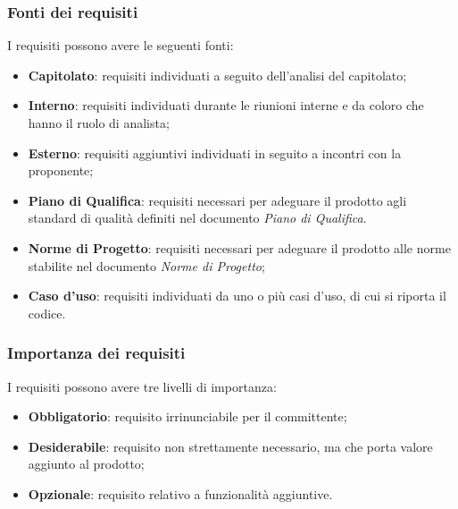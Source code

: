 \subsubsection{Fonti dei requisiti}
\label{sec:fonti_requisiti}
I requisiti possono avere le seguenti fonti:
\begin{itemize}
	\item \textbf{Capitolato}: requisiti individuati a seguito dell'analisi del capitolato;
	\item \textbf{Interno}: requisiti individuati durante le riunioni interne e da coloro che hanno il ruolo di analista;
	\item \textbf{Esterno}: requisiti aggiuntivi individuati in seguito a incontri con la proponente;
	\item \textbf{Piano di Qualifica}: requisiti necessari per adeguare il prodotto agli standard di qualità definiti nel documento \textit{Piano di Qualifica}.
	\item \textbf{Norme di Progetto}: requisiti necessari per adeguare il prodotto alle norme stabilite nel documento \textit{Norme di Progetto};
	\item \textbf{Caso d'uso}: requisiti individuati da uno o più casi d'uso, di cui si riporta il codice.
\end{itemize}

\subsubsection{Importanza dei requisiti}
\label{sec:importanza_requisiti}
I requisiti possono avere tre livelli di importanza:
\begin{itemize}
	\item \textbf{Obbligatorio}: requisito irrinunciabile per il committente;
	\item \textbf{Desiderabile}: requisito non strettamente necessario, ma che porta valore aggiunto al prodotto;
	\item \textbf{Opzionale}: requisito relativo a funzionalità aggiuntive.
\end{itemize}


